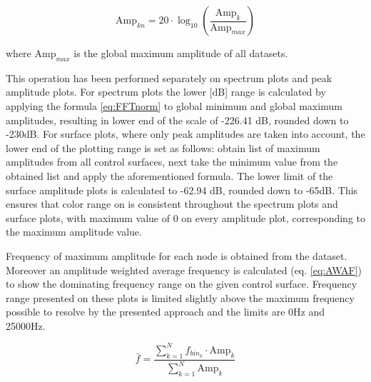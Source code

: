 \begin{equation} \label{eq:FFTnorm}
\text{Amp}_{kn} = 20 \cdot \log_{10} \left( \frac{\text{Amp}_{k}}{\text{Amp}_{max}} \right)
\end{equation}

\noindent where $\text{Amp}_{max}$ is the global maximum amplitude of all datasets.

This operation has been performed separately on spectrum plots and peak amplitude plots. For spectrum plots the lower [dB] range is calculated by applying the formula \ref{eq:FFTnorm} to global minimum and global maximum amplitudes, resulting in lower end of the scale of -226.41 dB, rounded down to -230dB. For surface plots, where only peak amplitudes are taken into account, the lower end of the plotting range is set as follows: obtain list of maximum amplitudes from all control surfaces, next take the minimum value from the obtained list and apply the aforementioned formula. The lower limit of the surface amplitude plots is calculated to -62.94 dB, rounded down to -65dB. This ensures that color range on is consistent throughout the spectrum plots and surface plots, with maximum value of 0 on every amplitude plot, corresponding to the maximum amplitude value.

Frequency of maximum amplitude for each node is obtained from the dataset. Moreover an amplitude weighted average frequency is calculated (eq. \ref{eq:AWAF}) to show the dominating frequency range on the given control surface. Frequency range presented on these plots is limited slightly above the maximum frequency possible to resolve by the presented approach and the limits are 0Hz and 25000Hz.

\begin{equation} \label{eq:AWAF}
\bar{f} = \frac{\sum_{k=1}^{N} f_{bin_k} \cdot \text{Amp}_k}{\sum_{k=1}^{N} \text{Amp}_{k}}
\end{equation}


